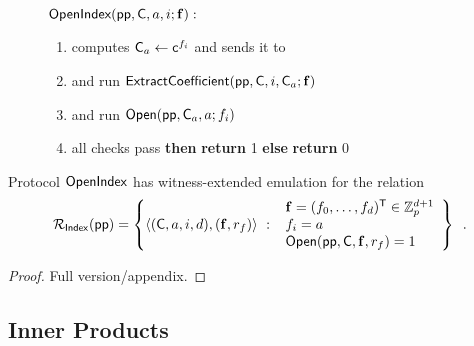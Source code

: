 \begin{figure}[!htp]
\noindent\begin{mdframed}[userdefinedwidth=\textwidth]
\begin{minipage}{\textwidth}
	\begin{flushleft}
	$\textsf{{OpenIndex}}(\textsf{pp}, \mathsf{C}, a, i; \mathbf{f}):$ 
		\begin{enumerate}[nolistsep]
		    \item \prover computes $\mathsf{C}_a \gets \mathsf{c}^{f_i}$ and sends it to \verifier
		    \item \prover and \verifier run $\textsf{{ExtractCoefficient}}(\textsf{pp}, \mathsf{C}, i, \mathsf{C}_a; \mathbf{f})$
		    \item \prover and \verifier run $\textsf{{Open}}(\textsf{pp}, \mathsf{C}_a, a; f_i)$
		    \item \pcif{}all checks pass \textbf{then} \textbf{return} 1 \textbf{else} \textbf{return} 0
		\end{enumerate}
	\end{flushleft}
\end{minipage}
\end{mdframed}
\end{figure}

\begin{lemma}
    Protocol $\textsf{{OpenIndex}}$ has witness-extended emulation for the relation
    \[
        \mathcal{R}_\mathsf{Index}(\params) = \left\{
            \langle(\gr{C}, a, i, d), (\mathbf{f}, r_f)\rangle \ : \ \begin{array}{l}
                \mathbf{f} = (f_0, \ldots, f_d)^\mathsf{T} \in \mathbb{Z}_p^{d+1} \\
                f_i = a \\
                \pro{Open}(\params, \gr{C}, \mathbf{f}, r_f) = 1
            \end{array}
        \right\} \enspace .
    \]
\end{lemma}

\begin{proof}
Full version/appendix.
\end{proof}
\fi 

\subsection{Inner Products}


